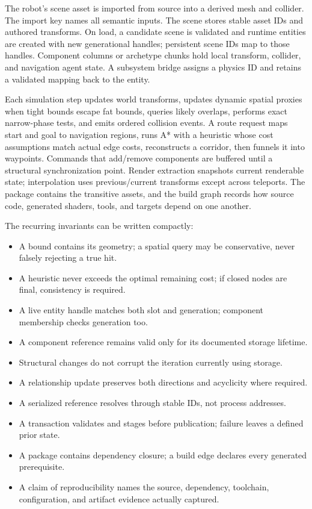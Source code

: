 The robot's scene asset is imported from source into a derived mesh and collider. The import key names all semantic inputs. The scene stores stable asset IDs and authored transforms. On load, a candidate scene is validated and runtime entities are created with new generational handles; persistent scene IDs map to those handles. Component columns or archetype chunks hold local transform, collider, and navigation agent state. A subsystem bridge assigns a physics ID and retains a validated mapping back to the entity.

Each simulation step updates world transforms, updates dynamic spatial proxies when tight bounds escape fat bounds, queries likely overlaps, performs exact narrow-phase tests, and emits ordered collision events. A route request maps start and goal to navigation regions, runs A* with a heuristic whose cost assumptions match actual edge costs, reconstructs a corridor, then funnels it into waypoints. Commands that add/remove components are buffered until a structural synchronization point. Render extraction snapshots current renderable state; interpolation uses previous/current transforms except across teleports. The package contains the transitive assets, and the build graph records how source code, generated shaders, tools, and targets depend on one another.

The recurring invariants can be written compactly:

\begin{itemize}
\tightlist
\item
  A bound contains its geometry; a spatial query may be conservative, never falsely rejecting a true hit.
\item
  A heuristic never exceeds the optimal remaining cost; if closed nodes are final, consistency is required.
\item
  A live entity handle matches both slot and generation; component membership checks generation too.
\item
  A component reference remains valid only for its documented storage lifetime.
\item
  Structural changes do not corrupt the iteration currently using storage.
\item
  A relationship update preserves both directions and acyclicity where required.
\item
  A serialized reference resolves through stable IDs, not process addresses.
\item
  A transaction validates and stages before publication; failure leaves a defined prior state.
\item
  A package contains dependency closure; a build edge declares every generated prerequisite.
\item
  A claim of reproducibility names the source, dependency, toolchain, configuration, and artifact evidence actually captured.
\end{itemize}

